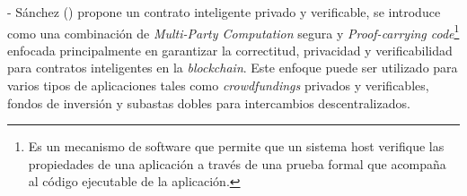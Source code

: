     

    - Sánchez (\citeyear{sanchez2020}) propone un contrato inteligente privado y verificable, se introduce como una combinación de \textit{Multi-Party 
    Computation} segura y \textit{Proof-carrying code}\footnote{Es un mecanismo de software que permite que un sistema host verifique las 
    propiedades de una aplicación a través de una prueba formal que acompaña al código ejecutable de la aplicación.} enfocada 
    principalmente en garantizar la correctitud, privacidad y 
    verificabilidad para contratos inteligentes en la \textit{blockchain}. Este enfoque puede ser utilizado 
    para varios tipos de aplicaciones tales
    como \textit{crowdfundings} privados y verificables, fondos de inversión y subastas dobles para intercambios descentralizados.


